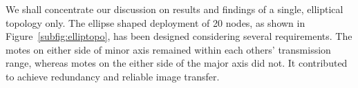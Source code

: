 \documentclass[conference]{IEEEtran}
\newcommand{\notedme}[1]{\raisebox{0pt}[0pt][0pt]{\pdfcomment[open=true,color=blue]{#1}}}
\begin{document}

We shall concentrate our discussion on results and findings of a single, elliptical topology only.
The ellipse shaped deployment of 20 nodes, as shown in Figure~\ref{subfig:elliptopo}, has been designed considering several requirements.
The motes on either side of minor axis remained within each others' transmission range, whereas motes on the either side of the major axis did not.
It contributed to achieve  redundancy and  reliable image transfer. 
\end{document}
